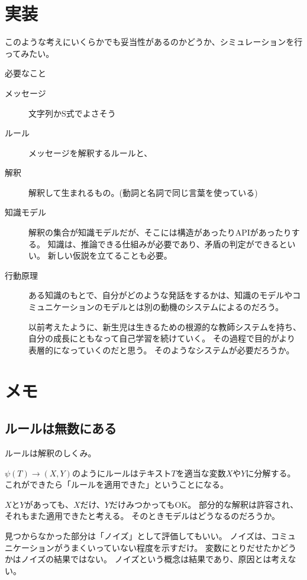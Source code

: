 \documentclass[10pt, oneside]{jarticle}   	%
\begin{document}
\section{実装}
このような考えにいくらかでも妥当性があるのかどうか、シミュレーションを行ってみたい。

必要なこと
\begin{description}
\item[ メッセージ] 文字列かS式でよさそう
\item[ ルール]メッセージを解釈するルールと、
\item[ 解釈]解釈して生まれるもの。(動詞と名詞で同じ言葉を使っている)
\item[ 知識モデル] 解釈の集合が知識モデルだが、そこには構造があったりAPIがあったりする。
知識は、推論できる仕組みが必要であり、矛盾の判定ができるといい。
新しい仮説を立てることも必要。
\item[ 行動原理]ある知識のもとで、自分がどのような発話をするかは、知識のモデルやコミュニケーションのモデルとは別の動機のシステムによるのだろう。

以前考えたように、新生児は生きるための根源的な教師システムを持ち、自分の成長にともなって自己学習を続けていく。
その過程で目的がより表層的になっていくのだと思う。
そのようなシステムが必要だろうか。
\end{description}

\section{メモ}
\subsection{ルールは無数にある}
ルールは解釈のしくみ。

$\psi(T) \to (X,Y)$のようにルールはテキスト$T$を適当な変数$X$や$Y$に分解する。
これができたら「ルールを適用できた」ということになる。

$X$と$Y$があっても、$X$だけ、$Y$だけみつかってもOK。
部分的な解釈は許容され、それもまた適用できたと考える。
そのときモデルはどうなるのだろうか。

見つからなかった部分は「ノイズ」として評価してもいい。
ノイズは、コミュニケーションがうまくいっていない程度を示すだけ。
変数にとりだせたかどうかはノイズの結果ではない。
ノイズという概念は結果であり、原因とは考えない。
\end{document}
